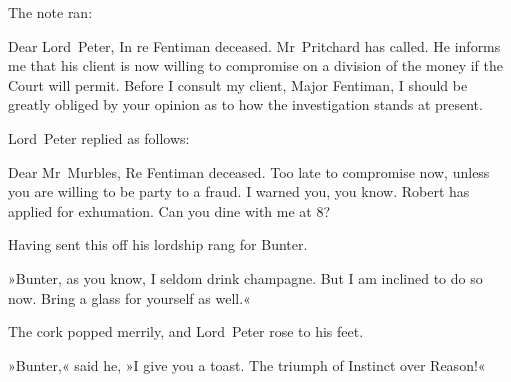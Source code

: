 The note ran:


\begin{mail}{}{Dear Lord~Peter,}
In re Fentiman deceased. Mr~Pritchard has called. He informs me that his client is now willing to compromise on a division of the money if the Court will permit. Before I consult my client, Major Fentiman, I should be greatly obliged by your opinion as to how the investigation stands at present.
\end{mail}

\begin{letter}
	\clearpage
\end{letter}

Lord~Peter replied as follows:

\begin{mail}{}{Dear Mr~Murbles,}
Re Fentiman deceased. Too late to compromise now, unless you are willing to be party to a fraud. I warned you, you know. Robert has applied for exhumation. Can you dine with me at 8?
\end{mail}

Having sent this off his lordship rang for Bunter.

»Bunter, as you know, I seldom drink champagne. But I am inclined to do so now. Bring a glass for yourself as well.«

The cork popped merrily, and Lord~Peter rose to his feet.

»Bunter,« said he, »I give you a toast. The triumph of Instinct over Reason!«